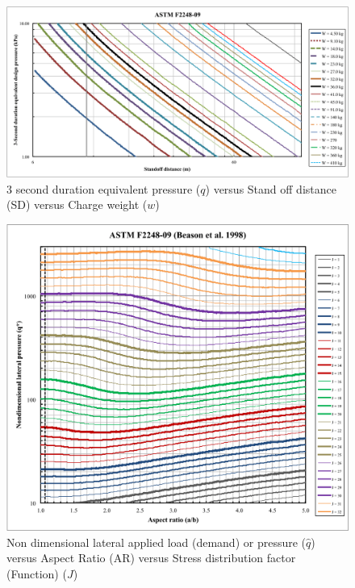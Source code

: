 \documentclass[12pt]{article}
\begin{document}
\begin{figure}
\begin{center}
\includegraphics[width=\textwidth]{../../../../datafiles/glassbr/ASTM_F2248-09.png}
\caption{3 second duration equivalent pressure ($q$) versus Stand off distance (SD) versus Charge weight ($w$)}
\label{Figure:demandVSsod}
\end{center}
\end{figure}
\begin{figure}
\begin{center}
\includegraphics[width=\textwidth]{../../../../datafiles/glassbr/ASTM_F2248-09_BeasonEtAl.png}
\caption{Non dimensional lateral applied load (demand) or pressure ($\hat{q}$) versus Aspect Ratio (AR) versus Stress distribution factor (Function) ($J$)}
\label{Figure:dimlessloadVSaspect}
\end{center}
\end{figure}
\end{document}
